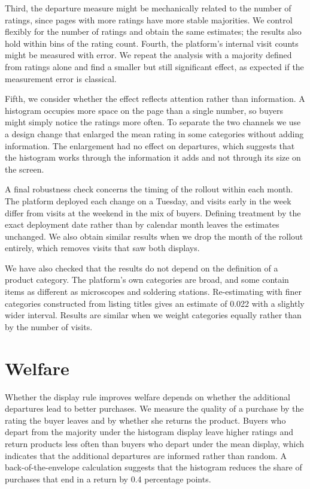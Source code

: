 \documentclass[12pt]{article}
\begin{document}
Third, the departure measure might be mechanically related to the number of ratings, since pages with more ratings have more stable majorities. We control flexibly for the number of ratings and obtain the same estimates; the results also hold within bins of the rating count. Fourth, the platform's internal visit counts might be measured with error. We repeat the analysis with a majority defined from ratings alone and find a smaller but still significant effect, as expected if the measurement error is classical.

Fifth, we consider whether the effect reflects attention rather than information. A histogram occupies more space on the page than a single number, so buyers might simply notice the ratings more often. To separate the two channels we use a design change that enlarged the mean rating in some categories without adding information. The enlargement had no effect on departures, which suggests that the histogram works through the information it adds and not through its size on the screen.

A final robustness check concerns the timing of the rollout within each month. The platform deployed each change on a Tuesday, and visits early in the week differ from visits at the weekend in the mix of buyers. Defining treatment by the exact deployment date rather than by calendar month leaves the estimates unchanged. We also obtain similar results when we drop the month of the rollout entirely, which removes visits that saw both displays.

We have also checked that the results do not depend on the definition of a product category. The platform's own categories are broad, and some contain items as different as microscopes and soldering stations. Re-estimating with finer categories constructed from listing titles gives an estimate of 0.022 with a slightly wider interval. Results are similar when we weight categories equally rather than by the number of visits.

\section{Welfare}
Whether the display rule improves welfare depends on whether the additional departures lead to better purchases. We measure the quality of a purchase by the rating the buyer leaves and by whether she returns the product. Buyers who depart from the majority under the histogram display leave higher ratings and return products less often than buyers who depart under the mean display, which indicates that the additional departures are informed rather than random. A back-of-the-envelope calculation suggests that the histogram reduces the share of purchases that end in a return by 0.4 percentage points.
\end{document}

